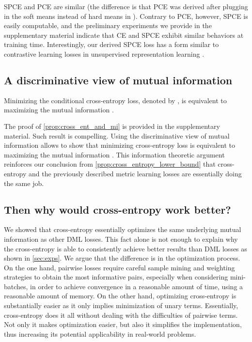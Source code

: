 \documentclass[runningheads]{llncs}
\begin{document}
SPCE and PCE are similar (the difference is that PCE was derived after plugging in the soft means instead of hard means in ). Contrary to PCE, however, SPCE is easily computable, and the preliminary experiments we provide in the supplementary material indicate that CE and SPCE exhibit similar behaviors at training time. 
Interestingly, our derived SPCE loss has a form similar to contrastive learning losses in unsupervised representation learning \cite{oord2018representation, tschannen2019mutual, chen2020simple}.



 


\subsection{A discriminative view of mutual information}\label{sec:cross_entropy_mi}

\begin{lemma}\label{prop:cross_ent_and_mi}
Minimizing the conditional cross-entropy loss, denoted by  , is equivalent to maximizing the mutual information .
\end{lemma}




The proof of \autoref{prop:cross_ent_and_mi} is provided in the supplementary material. Such result is compelling. Using the discriminative view of mutual information allows to show that minimizing cross-entropy loss is equivalent to maximizing the mutual information . This information theoretic argument reinforces our conclusion from \autoref{prop:cross_entropy_lower_bound} that cross-entropy and the previously described metric learning losses are essentially doing the same job.

\subsection{Then why would cross-entropy work better?}

We showed that cross-entropy essentially optimizes the same underlying mutual information  as other DML losses. This fact alone is not enough to explain why the cross-entropy is able to consistently achieve better results than DML losses as shown in \autoref{sec:exps}. We argue that the difference is in the optimization process. On the one hand, pairwise losses require careful sample mining and weighting strategies to obtain the most informative pairs, especially when considering mini-batches, in order to achieve convergence in a reasonable amount of time, using a reasonable amount of memory. On the other hand, optimizing cross-entropy is substantially easier as it only implies minimization of unary terms. 
Essentially, cross-entropy does it all without dealing with the difficulties of pairwise terms.
Not only it makes optimization easier, but also it simplifies the implementation, thus increasing its potential applicability in real-world problems.
\end{document}
